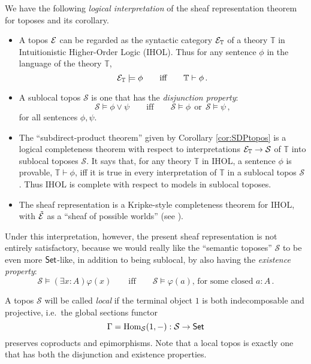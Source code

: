\documentclass[lambek.tex]{subfiles}
\begin{document}
We have the following \emph{logical interpretation} of the sheaf representation theorem for toposes and its corollary.
%
\begin{itemize}
\item A topos $\mathcal{E}$ can be regarded as the syntactic category $\mathcal{E}_\mathbb{T}$ of a theory $\mathbb{T}$ in Intuitionistic Higher-Order Logic (IHOL).  Thus for any sentence $\phi$ in the language of the theory $\mathbb{T}$,
\[ 
\mathcal{E}_\mathbb{T}\models \phi \qquad\text{iff}\qquad \mathbb{T} \vdash \phi\,.
\]

\item A sublocal topos $\mathcal{S}$ is one that has the \emph{disjunction property}:
\[
\mathcal{S}\models \phi\vee \psi \qquad\text{iff}\qquad \mathcal{S}\models \phi\  \ \text{or}\  \ \mathcal{S}\models \psi\,,
\]
for all sentences $\phi, \psi$.

\item  The ``subdirect-product theorem'' given by Corollary \ref{cor:SDPtopos} is a logical completeness theorem with respect to interpretations $\mathcal{E}_\mathbb{T}\rightarrow\mathcal{S}$ of $\mathbb{T}$ into sublocal toposes $\mathcal{S}$.  It says that, for any theory $\mathbb{T}$ in IHOL, a sentence $\phi$ is provable, $\mathbb{T}\vdash \phi$,  iff it is true in every interpretation of $\mathbb{T}$ in a sublocal topos $\mathcal{S}$.  Thus IHOL is complete with respect to models in sublocal toposes.

\item The sheaf representation is a Kripke-style completeness theorem for IHOL, with $\tilde{\mathcal{E}}$ as a ``sheaf of possible worlds'' (see \cite{Lambeck:sheaf of possible worlds}).
\end{itemize}

Under this interpretation, however, the present sheaf representation is not entirely satisfactory, because we would really like the ``semantic toposes'' $\mathcal{S}$ to be even more $\mathsf{Set}$-like, in addition to being sublocal, by also having the \emph{existence property}:
\[
\mathcal{S}\models (\exists x:A)\varphi(x) \qquad\text{iff}\qquad  \mathcal{S}\models \varphi(a)\text{, for some closed $a:A$}\,.
\] 

\begin{definition}\label{def:localtopos}
A topos $\mathcal{S}$ will be called \emph{local} if the terminal object $1$ is both indecomposable and projective, i.e.\ the global sections functor 
\[
\Gamma = \mathrm{Hom}_\mathcal{S}(1, - ) : \mathcal{S} \to \mathsf{Set}
\]
preserves coproducts and epimorphisms. Note that a local topos is exactly one that has both the disjunction and existence properties.
\end{definition}
\end{document}
